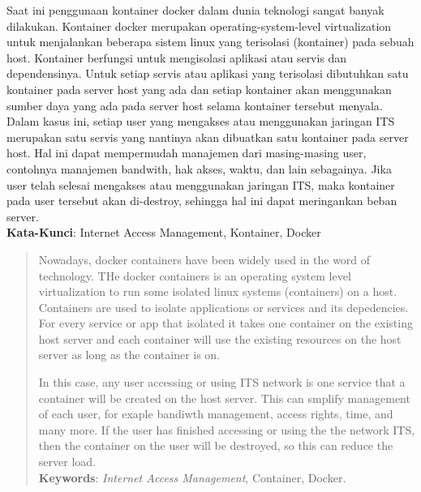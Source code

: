 \begin{abstrak}
	\indent Saat ini penggunaan kontainer docker dalam dunia teknologi sangat banyak dilakukan. Kontainer docker merupakan operating-system-level virtualization untuk menjalankan beberapa sistem linux yang terisolasi (kontainer) pada sebuah host. Kontainer berfungsi untuk mengisolasi aplikasi atau servis dan dependensinya. Untuk setiap servis atau aplikasi yang terisolasi dibutuhkan satu kontainer pada server host yang ada dan setiap kontainer akan menggunakan sumber daya yang ada pada server host selama kontainer tersebut menyala.\\
    	\indent Dalam kasus ini, setiap user yang mengakses atau menggunakan jaringan ITS merupakan satu servis yang nantinya akan dibuatkan satu kontainer pada server host. Hal ini dapat mempermudah manajemen dari masing-masing user, contohnya manajemen bandwith, hak akses, waktu, dan lain sebagainya. Jika user telah selesai mengakses atau menggunakan jaringan ITS, maka kontainer pada user tersebut akan di-destroy, sehingga hal ini dapat meringankan beban server.\\

\noindent \textbf{Kata-Kunci}:  Internet Access Management, Kontainer, Docker
\end{abstrak}

\cleardoublepage
\begin{abstract}
	\indent Nowadays, docker containers have been widely used in the word of technology. THe docker containers is an operating system level virtualization to run some isolated linux systems (containers) on a host. Containers are used to isolate applications or services and its depedencies. For every service or app that isolated it takes one container on the existing host server and each container will use the existing resources on the host server as long as the container is on.
	
	In this case, any user accessing or using ITS network is one service that a container will be created on the host server. This can smplify management of each user, for exaple bandiwth management, access rights, time, and many more. If the user has finished accessing or using the the network ITS, then the container on the user will be destroyed, so this can reduce the server load. \\

\noindent \textbf{Keywords}:  \textit{Internet Access Management}, Container, Docker.
\end{abstract}